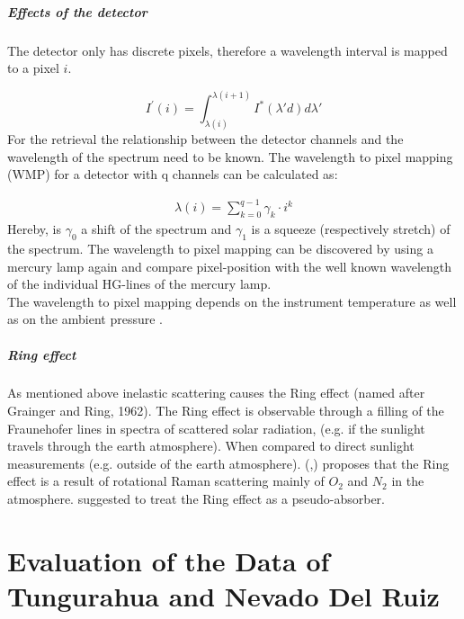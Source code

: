 \documentclass  [
  paper    = a4,
  BCOR     = 10mm,
  twoside,
  fontsize = 12pt,
  fleqn,
  toc      = bibnumbered,
  toc      = listofnumbered,
  numbers  = noendperiod,
  headings = normal,
  listof   = leveldown,
  version  = 3.03
]                                       {scrreprt}
\begin{document}
	\subsubsection*{Effects of the detector}
	The detector only has discrete pixels, therefore a wavelength interval is mapped to a pixel $i$.
	
	\begin{equation}
	I^{'}\left(i\right) = \int_{\lambda(i)}^{\lambda(i+1)}I^{*}\left(\lambda{'}d\right)d\lambda{'}
	\end{equation}
	For the retrieval the relationship between the detector channels and the wavelength of the spectrum need to be known.
	The wavelength to pixel mapping (WMP) for a detector with q channels can be calculated as:

	\begin{eqnarray}
	\lambda(i) = \sum_{k=0}^{q-1}\gamma_{k}\cdot i^{k}
	\end{eqnarray}
	Hereby, is $\gamma_{0}$ a shift of the spectrum and $\gamma_{1}$ is a squeeze (respectively stretch) of the spectrum.
	The wavelength to pixel mapping can be discovered by using a mercury lamp again and compare pixel-position with the well known wavelength of the individual HG-lines of the mercury lamp.\\
	The wavelength to pixel mapping depends on the instrument temperature as well as on the ambient pressure \cite{lubcke2014bro}.
	\subsubsection*{Ring effect}
	As mentioned above inelastic scattering causes the Ring effect (named after Grainger and Ring, 1962).
	The Ring effect is observable through a filling of the Fraunehofer lines in spectra of scattered solar radiation, (e.g. if the sunlight travels through the earth atmosphere). When compared to direct sunlight measurements (e.g. outside of the earth atmosphere).
	(\cite{bussemer1993ring},\cite{solomon1987interpretation}) proposes that the Ring effect is a result of  rotational Raman scattering mainly of
	$O_2$ and $N_2$ in the atmosphere.
	\cite{solomon1987interpretation} suggested to treat the Ring effect as a pseudo-absorber. 


	
	\part{Evaluation of the Data of Tungurahua and Nevado Del Ruiz}
	
\end{document}

